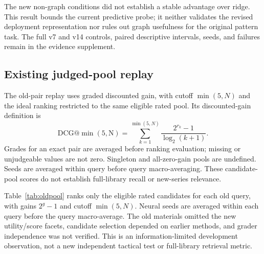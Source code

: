 The new non-graph conditions did not establish a stable advantage over ridge. This result bounds the current predictive probe; it neither validates the revised deployment representation nor rules out graph usefulness for the original pattern task. The full v7 and v14 controls, paired descriptive intervals, seeds, and failures remain in the evidence supplement.

\subsection{Existing judged-pool replay}
\label{app:oldpool}
The old-pair replay uses graded discounted gain, with cutoff $\min(5,N)$ and the ideal ranking restricted to the same eligible rated pool. Its discounted-gain definition is
\begin{equation}
 \mathrm{DCG@\min(5,N)}=\sum_{k=1}^{\min(5,N)}
 \frac{2^{r_k}-1}{\log_2(k+1)}.
\end{equation}
Grades for an exact pair are averaged before ranking evaluation; missing or unjudgeable values are not zero. Singleton and all-zero-gain pools are undefined. Seeds are averaged within query before query macro-averaging. These candidate-pool scores do not establish full-library recall or new-series relevance.

Table~\ref{tab:oldpool} ranks only the eligible rated candidates for each old query, with gains $2^g-1$ and cutoff $\min(5,N)$. Neural seeds are averaged within each query before the query macro-average. The old materials omitted the new utility/score facets, candidate selection depended on earlier methods, and grader independence was not verified. This is an information-limited development observation, not a new independent tactical test or full-library retrieval metric. %

